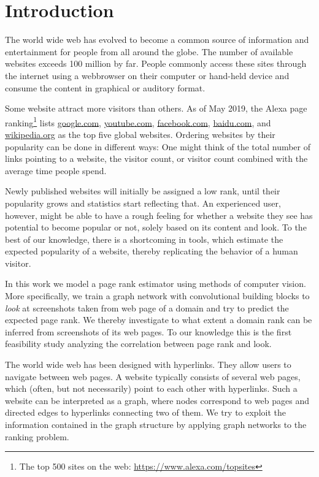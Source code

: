 \section{Introduction}
\label{section:introduction}

The world wide web has evolved to become a common source of information and entertainment for people from all around the globe. The number of available websites exceeds 100 million by far.
People commonly access these sites through the internet using a webbrowser on their computer or hand-held device and consume the content in graphical or auditory format.

Some website attract more visitors than others. As of May 2019, the Alexa page ranking\footnote{The top 500 sites on the web: \url{https://www.alexa.com/topsites}} lists \url{google.com}, \url{youtube.com}, \url{facebook.com}, \url{baidu.com}, and \url{wikipedia.org} as the top five global websites. Ordering websites by their popularity can be done in different ways: One might think of the total number of links pointing to a website, the visitor count, or visitor count combined with the average time people spend.

Newly published websites will initially be assigned a low rank, until their popularity grows and statistics start reflecting that. An experienced user, however, might be able to have a rough feeling for whether a website they see has potential to become popular or not, solely based on its content and look. To the best of our knowledge, there is a shortcoming in tools, which estimate the expected popularity of a website, thereby replicating the behavior of a human visitor.

In this work we model a page rank estimator using methods of computer vision. More specifically, we train a graph network with convolutional building blocks to \textit{look} at screenshots taken from web page of a domain and try to predict the expected page rank. We thereby investigate to what extent a domain rank can be inferred from screenshots of its web pages. To our knowledge this is the first feasibility study analyzing the correlation between page rank and look.

The world wide web has been designed with hyperlinks. They allow users to navigate between web pages. A website typically consists of several web pages, which (often, but not necessarily) point to each other with hyperlinks. Such a website can be interpreted as a graph, where nodes correspond to web pages and directed edges to hyperlinks connecting two of them. We try to exploit the information contained in the graph structure by applying graph networks to the ranking problem.

